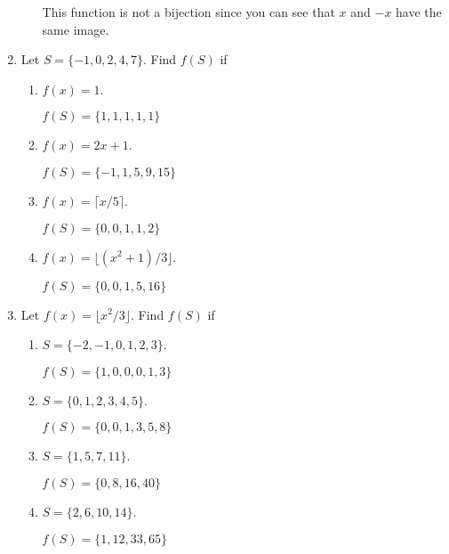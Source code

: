 \documentclass[11pt]{article}
\begin{document}
\begin{enumerate}[label=\textbf{\arabic*.}]
\begin{enumerate}[label=\textbf{\alph*)}]
		This function is not a bijection since you can see that $x$ and $-x$ have the same image.
	\end{enumerate}

	\item Let $S = \{-1, 0, 2, 4, 7\}$. Find $f(S)$ if
	
	\begin{enumerate}[label=\textbf{\alph*)}]
		\item $f(x) = 1$.
		
		$f(S) = \{1, 1, 1, 1, 1\}$
		
		\item $f(x) = 2x + 1$.
		
		$f(S) = \{-1, 1, 5, 9, 15\}$
		
		\item $f(x) = \lceil x / 5 \rceil$.
		
		$f(S) = \{0, 0, 1, 1, 2\}$
		
		\item $f(x) = \lfloor (x^2 + 1) / 3 \rfloor$.
		
		$f(S) = \{0, 0, 1, 5, 16\}$
	\end{enumerate}

	\item Let $f(x) = \lfloor x^2 / 3 \rfloor$. Find $f(S)$ if
	
	\begin{enumerate}[label=\textbf{\alph*)}]
		\item $S = \{-2, -1, 0, 1, 2, 3\}$.
		
		$f(S) = \{1, 0, 0, 0, 1, 3\}$
		
		\item $S = \{0, 1, 2, 3, 4, 5\}$.
		
		$f(S) = \{0, 0, 1, 3, 5, 8\}$
		
		\item $S = \{1, 5, 7, 11\}$.
		
		$f(S) = \{0, 8, 16, 40\}$
		
		\item $S = \{2, 6, 10, 14\}$.
		
		$f(S) = \{1, 12, 33, 65\}$
	\end{enumerate}
\end{enumerate}
\end{document}
